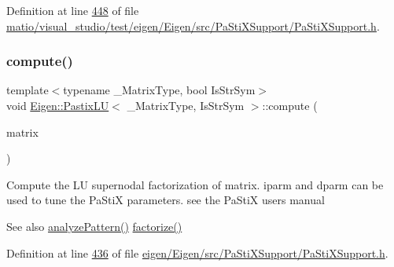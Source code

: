 Definition at line \hyperlink{matio_2visual__studio_2test_2eigen_2_eigen_2src_2_pa_sti_x_support_2_pa_sti_x_support_8h_source_l00448}{448} of file \hyperlink{matio_2visual__studio_2test_2eigen_2_eigen_2src_2_pa_sti_x_support_2_pa_sti_x_support_8h_source}{matio/visual\+\_\+studio/test/eigen/\+Eigen/src/\+Pa\+Sti\+X\+Support/\+Pa\+Sti\+X\+Support.\+h}.

\mbox{\label{class_eigen_1_1_pastix_l_u_adc28ee2550086c7bdfe991d624bde2ee}} 
\subsubsection{\texorpdfstring{compute()}{compute()}\hspace{0.1cm}{\footnotesize\ttfamily [1/2]}}
{\footnotesize\ttfamily template$<$typename \+\_\+\+Matrix\+Type, bool Is\+Str\+Sym$>$ \\
void \hyperlink{class_eigen_1_1_pastix_l_u}{Eigen\+::\+Pastix\+LU}$<$ \+\_\+\+Matrix\+Type, Is\+Str\+Sym $>$\+::compute (\begin{DoxyParamCaption}\item[{const Matrix\+Type \&}]{matrix }\end{DoxyParamCaption})\hspace{0.3cm}{\ttfamily [inline]}}

Compute the LU supernodal factorization of {\ttfamily matrix}. iparm and dparm can be used to tune the Pa\+StiX parameters. see the Pa\+StiX user\textquotesingle{}s manual \begin{DoxySeeAlso}{See also}
\hyperlink{class_eigen_1_1_pastix_l_u_abae3ca7f1254106d9e2d5e0f273189fa}{analyze\+Pattern()} \hyperlink{class_eigen_1_1_pastix_l_u_ac178a87b499a2210a402787fbfd98f26}{factorize()} 
\end{DoxySeeAlso}


Definition at line \hyperlink{eigen_2_eigen_2src_2_pa_sti_x_support_2_pa_sti_x_support_8h_source_l00436}{436} of file \hyperlink{eigen_2_eigen_2src_2_pa_sti_x_support_2_pa_sti_x_support_8h_source}{eigen/\+Eigen/src/\+Pa\+Sti\+X\+Support/\+Pa\+Sti\+X\+Support.\+h}.

\mbox{\label{class_eigen_1_1_pastix_l_u_adc28ee2550086c7bdfe991d624bde2ee}} 
